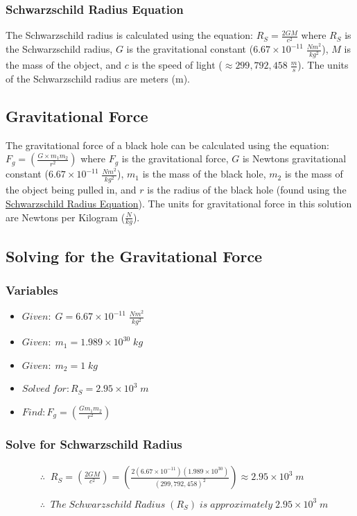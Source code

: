 \documentclass{article}
\begin{document}
\subsubsection{Schwarzschild Radius Equation}\label{sec:schwarzschild_radius_equation}
The Schwarzschild radius is calculated using the equation: $R_{S} = \frac{2GM}{c^2}$ where $R_{S}$ is the Schwarzschild radius, $G$ is the gravitational constant (\hyperref[sec:constants]{$6.67 \times 10^{-11}\;\frac{Nm^2}{kg^2}$}), $M$ is the mass of the object, and $c$ is the speed of light (\hyperref[sec:constants]{$\approx 299, 792, 458\;\frac{m}{s}$}). The units of the Schwarzschild radius are meters (m).

\subsection{Gravitational Force}
The gravitational force of a black hole can be calculated using the equation: $F_g = \left(\frac{G\times m_1m_2}{r^2}\right)$ where $F_g$ is the gravitational force, $G$ is Newtons gravitational constant (\hyperref[sec:constants]{$6.67 \times 10^{-11}\;\frac{Nm^2}{kg^2}$}), $m_1$ is the mass of the black hole, $m_2$ is the mass of the object being pulled in, and $r$ is the radius of the black hole (found using the \hyperref[sec:schwarzschild_radius_equation]{Schwarzschild Radius Equation}). The units for gravitational force in this solution are Newtons per Kilogram ($\frac{N}{kg}$).

\subsection{Solving for the Gravitational Force}
\subsubsection{Variables}
\begin{itemize}
    \item $Given:\; G = 6.67 \times 10^{-11}\;\frac{Nm^2}{kg^2}$
    \item $Given:\; m_1 = 1.989\times 10^{30}\;kg$
    \item $Given:\; m_2 = 1\;kg$
    \item $Solved\; for: R_S = 2.95 \times 10^{3}\;m$
    \item $Find: F_g = \left(\frac{Gm_1m_2}{r^2}\right)$
\end{itemize}\leavevmode

\subsubsection{Solve for Schwarzschild Radius}
\begin{align*}
     & \therefore\;\; R_{S} = \left(\frac{2GM}{c^2}\right) = \left(\frac{2(6.67 \times 10^{-11})(1.989\times 10^{30})}{(299,792,458)^2}\right) \approx 2.95 \times 10^{3} \;m \\\\
     & \therefore\;\; The\; Schwarzschild\; Radius\; (R_{S})\; is\; approximately\; 2.95 \times 10^{3} \;m
\end{align*}\leavevmode
\end{document}
